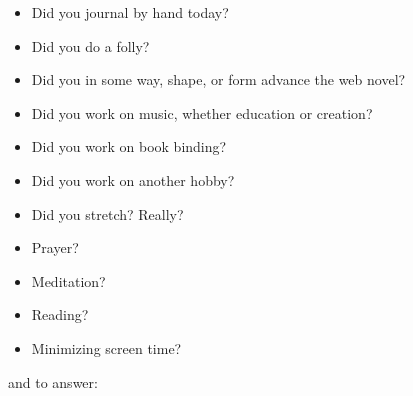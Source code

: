 \documentclass[12pt]{article}
\renewcommand{\,}{\textsuperscript{,}}
\begin{document}
\begin{itemize}

\item Did you journal by hand today?

\item Did you do a folly?

\item Did you in some way, shape, or form advance the web novel?

\item Did you work on music, whether education or creation?

\item Did you work on book binding?

\item Did you work on another hobby?

\item Did you stretch? Really?

\item Prayer?

\item Meditation?

\item Reading?

\item Minimizing screen time?

\end{itemize}

and to answer:
\end{document}
